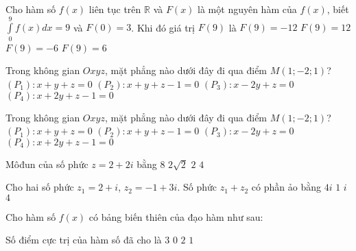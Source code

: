 \begin{ex}%
Cho hàm số $f(x)$ liên tục trên $\mathbb{R}$ và $F(x)$ là một nguyên hàm của $f(x)$, biết $\displaystyle \int\limits_{0}^{9}f(x)dx = 9$ và $F(0)=3$. Khi đó giá trị $F(9)$ là
\choice
{$F(9) = -12$}
{\True $F(9) = 12$}
{$F(9) = -6$}
{$F(9) = 6$}
\end{ex}
\begin{ex}%
Trong không gian $Oxyz$, mặt phẳng nào dưới đây đi qua điểm $M(1;-2;1)$?
\choice
{\True $(P_1)\colon x + y + z = 0$}
{$(P_2)\colon x + y + z - 1= 0$}
{$(P_3)\colon x - 2y + z = 0$}
{$(P_4)\colon x + 2y + z - 1= 0$}
\end{ex}
\begin{ex}%
Trong không gian $Oxyz$, mặt phẳng nào dưới đây đi qua điểm $M(1; -2; 1)$?
\choice
{\True $(P_1) \colon x + y + z = 0$}
{$(P_2) \colon x + y + z - 1 = 0$}
{$(P_3) \colon x - 2y + z = 0$}
{$(P_4) \colon x + 2y + z - 1 = 0$}
\end{ex}
\begin{ex}%
Môđun của số phức $z = 2 + 2i$ bằng
\choice
{$8$}
{\True $2\sqrt{2}$}
{$2$}
{$4$}
\end{ex}
\begin{ex}%
Cho hai số phức $z_1 = 2 + i$, $z_2 = -1 + 3i$. Số phức $z_1 + z_2$ có phần ảo bằng
\choice
{$4i$}
{$1$}
{$i$}
{\True $4$}
\end{ex}
\begin{ex}%
Cho hàm số $f(x)$ có bảng biến thiên của đạo hàm như sau:
\begin{center}
\end{center}
Số điểm cực trị của hàm số đã cho là
\choice
{$3$}
{$0$}
{\True $2$}
{$1$}
\end{ex}
